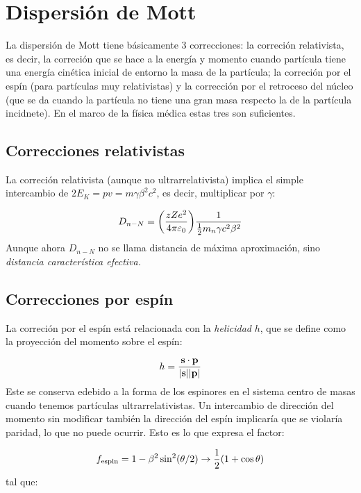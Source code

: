 \section{Dispersión de Mott} 

La dispersión de Mott tiene básicamente 3 correcciones: la correción relativista, es decir, la correción que se hace a la energía y momento cuando partícula tiene una energía cinética inicial de entorno la masa de la partícula; la correción por el espín (para partículas muy relativistas) y la corrección por el retroceso del núcleo (que se da cuando la partícula no tiene una gran masa respecto la de la partícula incidnete). En el marco de la física médica estas tres son suficientes. 

\subsection{Correcciones relativistas}

La correción relativista (aunque no ultrarrelativista) implica el simple intercambio de  $2E_K = p v = m \gamma \beta^2  c^2$, es decir, multiplicar por $\gamma$: 

\begin{equation}
    D_{n-N}  = \pqty{\frac{zZe^2}{4\pi\varepsilon_0}} \frac{1}{\frac{1}{2}m_n \gamma c^2 \beta^2}
\end{equation}
Aunque ahora $D_{n-N}$ no se llama distancia de máxima aproximación, sino \textit{distancia característica efectiva.}


\subsection{Correcciones por espín}

La correción por el espín está relacionada con la \textit{helicidad} $h$, que se define como la proyección del momento sobre el espín: 

\begin{equation*}
    h = \frac{\mathbf{s} \cdot \mathbf{p}}{|\mathbf{s}||\mathbf{p}|}
\end{equation*}
Este se conserva edebido a la forma de los espinores en el sistema centro de masas cuando tenemos partículas ultrarrelativistas. Un intercambio de dirección del momento sin modificar también la dirección del espín implicaría que se violaría paridad, lo que no puede ocurrir. Esto es lo que expresa el factor: 

\begin{equation}
    f_{\text{espin}} = 1 - \beta^2 \sin^2 (\theta/2) \to \frac{1}{2} \pqty{1+\cos \theta}
\end{equation}
tal que: 

